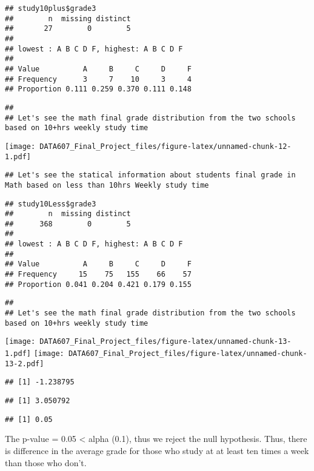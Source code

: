 \documentclass[
]{article}
\begin{document}
\begin{verbatim}
## study10plus$grade3 
##        n  missing distinct 
##       27        0        5 
## 
## lowest : A B C D F, highest: A B C D F
##                                         
## Value          A     B     C     D     F
## Frequency      3     7    10     3     4
## Proportion 0.111 0.259 0.370 0.111 0.148
\end{verbatim}

\begin{verbatim}
## 
## Let's see the math final grade distribution from the two schools based on 10+hrs weekly study time
\end{verbatim}

\texttt{[image: DATA607\_Final\_Project\_files/figure-latex/unnamed-chunk-12-1.pdf]}

\begin{verbatim}
## Let's see the statical information about students final grade in Math based on less than 10hrs Weekly study time
\end{verbatim}

\begin{verbatim}
## study10Less$grade3 
##        n  missing distinct 
##      368        0        5 
## 
## lowest : A B C D F, highest: A B C D F
##                                         
## Value          A     B     C     D     F
## Frequency     15    75   155    66    57
## Proportion 0.041 0.204 0.421 0.179 0.155
\end{verbatim}

\begin{verbatim}
## 
## Let's see the math final grade distribution from the two schools based on 10+hrs weekly study time
\end{verbatim}

\texttt{[image: DATA607\_Final\_Project\_files/figure-latex/unnamed-chunk-13-1.pdf]}
\texttt{[image: DATA607\_Final\_Project\_files/figure-latex/unnamed-chunk-13-2.pdf]}

\begin{verbatim}
## [1] -1.238795
\end{verbatim}

\begin{verbatim}
## [1] 3.050792
\end{verbatim}

\begin{verbatim}
## [1] 0.05
\end{verbatim}

The p-value = 0.05 \textless{} alpha (0.1), thus we reject the null
hypothesis. Thus, there is difference in the average grade for those who
study at at least ten times a week than those who don't.
\end{document}
